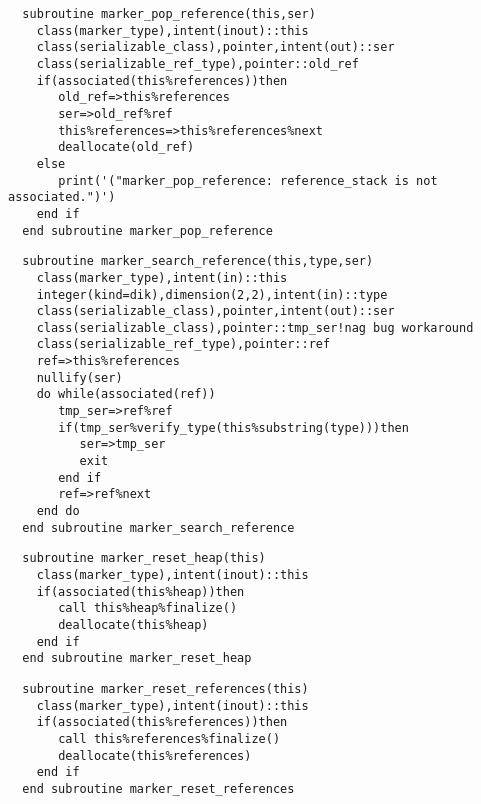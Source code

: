 \begin{Verbatim}
  subroutine marker_pop_reference(this,ser)
    class(marker_type),intent(inout)::this
    class(serializable_class),pointer,intent(out)::ser
    class(serializable_ref_type),pointer::old_ref
    if(associated(this%references))then
       old_ref=>this%references
       ser=>old_ref%ref
       this%references=>this%references%next
       deallocate(old_ref)
    else
       print('("marker_pop_reference: reference_stack is not associated.")')
    end if
  end subroutine marker_pop_reference
\end{Verbatim}

\begin{Verbatim}
  subroutine marker_search_reference(this,type,ser)
    class(marker_type),intent(in)::this
    integer(kind=dik),dimension(2,2),intent(in)::type
    class(serializable_class),pointer,intent(out)::ser
    class(serializable_class),pointer::tmp_ser!nag bug workaround
    class(serializable_ref_type),pointer::ref
    ref=>this%references
    nullify(ser)
    do while(associated(ref))
       tmp_ser=>ref%ref
       if(tmp_ser%verify_type(this%substring(type)))then
          ser=>tmp_ser
          exit
       end if
       ref=>ref%next
    end do
  end subroutine marker_search_reference
\end{Verbatim}

\begin{Verbatim}
  subroutine marker_reset_heap(this)
    class(marker_type),intent(inout)::this
    if(associated(this%heap))then
       call this%heap%finalize()
       deallocate(this%heap)
    end if
  end subroutine marker_reset_heap
\end{Verbatim}

\begin{Verbatim}
  subroutine marker_reset_references(this)
    class(marker_type),intent(inout)::this
    if(associated(this%references))then
       call this%references%finalize()
       deallocate(this%references)
    end if
  end subroutine marker_reset_references
\end{Verbatim}

